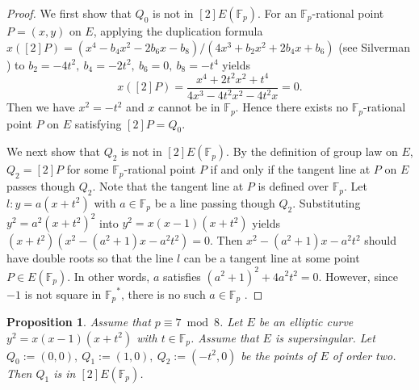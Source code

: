 \documentclass[10pt,a4paper]{amsart}
\theoremstyle{plain}
\newtheorem{prop}[defn]{Proposition}
\newcommand{\fp}{\mathbb{F}_p}
\begin{document}
\begin{proof}

    We first show that $Q_0$ is not in $[2]E(\fp)$. For an $\fp$-rational point $P=(x,y)$ on $E$, applying the duplication formula  $x([2]P)=(x^4-b_4x^2-2b_6x-b_8)/(4x^3+b_2x^2+2b_4x+b_6)$ (see Silverman \cite[Group Law Algorithm 2.3 (d)]{AEC}) to $b_2=-4t^2,\ b_4=-2t^2,\ b_6=0,\ b_8=-t^4$ yields
        \[
        x([2]P)= \frac{x^4+2t^2x^2+t^4}{4x^3-4t^2x^2-4t^2x}=0 .
        \]
    Then we have $x^2=-t^2$ and $x$ cannot be in $\fp$. Hence there exists no $\fp$-rational point $P$ on $E$ satisfying $[2]P=Q_0$.

    We next show that $Q_2$ is not in $[2]E(\fp)$. By the definition of group law on $E$, $Q_2=[2]P$ for some $\fp$-rational point $P$ if and only if the tangent line at $P$ on $E$ passes though $Q_2$. Note that the tangent line at $P$ is defined over $\fp$.  Let $l:y=a(x+t^2)$ with $a \in \fp$ be a line passing though $Q_2$. Substituting $y^2=a^2(x+t^2)^2$ into $y^2=x(x-1)(x+t^2)$ yields $(x+t^2)(x^2-(a^2+1)x-a^2t^2)=0$. Then $x^2-(a^2+1)x-a^2t^2$ should have double roots so that the line $l$ can be a tangent line at some point $P \in E(\fp)$. In other words, $a$ satisfies 
        $(a^2+1)^2+4a^2t^2=0$. However, since $-1$ is not square in ${\fp}^{*}$, there is no such $a\in \fp$ .    
\end{proof}

\begin{prop}
\label{p7in2}
    Assume that $p \equiv 7 \bmod 8$. Let $E$ be an elliptic curve $y^2=x(x-1)(x+t^2)$ with $t \in \fp$. Assume that $E$ is supersingular. Let $Q_0:=(0,0),\ Q_1:=(1,0),\ Q_2:=(-t^2,0)$ be the points of $E$ of order two. Then $Q_1$ is in $[2]E(\fp)$.
\end{prop}
\end{document}
